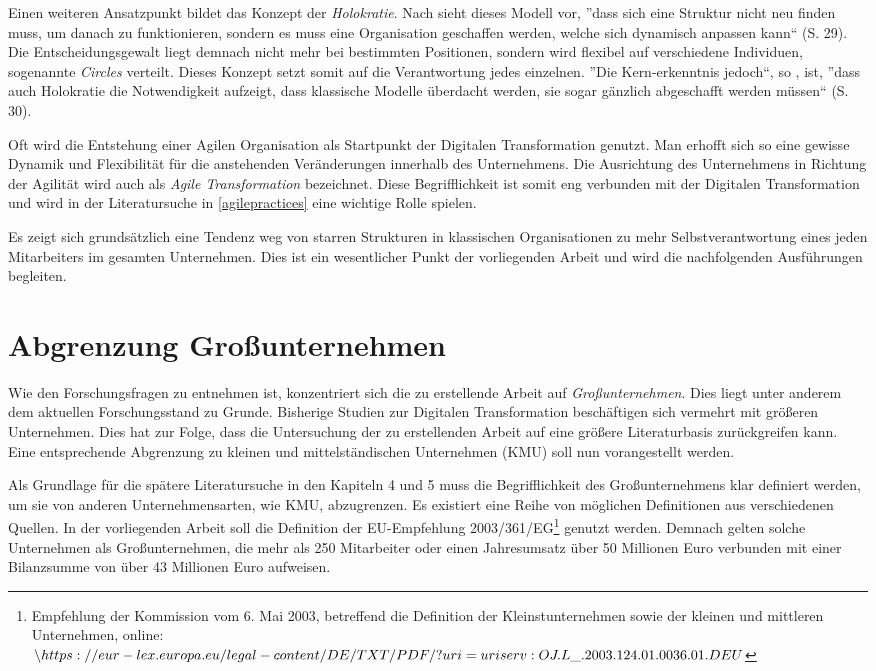 Einen weiteren Ansatzpunkt bildet das Konzept der \textit{Holokratie}. Nach  sieht dieses Modell vor, ''dass sich eine Struktur nicht neu finden muss, um danach zu funktionieren, sondern es muss eine Organisation geschaffen werden, welche sich dynamisch anpassen kann`` (S. 29). Die Entscheidungsgewalt liegt demnach nicht mehr bei bestimmten Positionen, sondern wird flexibel auf verschiedene Individuen, sogenannte \textit{Circles} verteilt. Dieses  Konzept setzt somit auf die Verantwortung jedes einzelnen. ''Die Kern-erkenntnis jedoch``, so , ist,  ''dass auch Holokratie die Notwendigkeit aufzeigt, dass klassische Modelle überdacht werden, sie sogar gänzlich abgeschafft werden müssen`` (S. 30). 

Oft wird die Entstehung einer Agilen Organisation als Startpunkt der Digitalen Transformation genutzt. Man erhofft  sich so eine gewisse Dynamik und Flexibilität für die anstehenden Veränderungen innerhalb des Unternehmens. \cite[S. 1]{fuchs_becoming_nodate} Die Ausrichtung des Unternehmens in Richtung der Agilität wird auch als \textit{Agile Transformation} bezeichnet. Diese Begrifflichkeit ist somit eng verbunden mit der Digitalen Transformation und wird in der Literatursuche in \ref{agilepractices} eine wichtige Rolle spielen.

Es zeigt sich grundsätzlich eine Tendenz weg von starren Strukturen in klassischen Organisationen zu mehr Selbstverantwortung eines jeden Mitarbeiters im gesamten Unternehmen. Dies ist ein wesentlicher Punkt der vorliegenden Arbeit und wird die nachfolgenden Ausführungen begleiten. 

\section{Abgrenzung Großunternehmen}

Wie den Forschungsfragen zu entnehmen ist, konzentriert sich die zu erstellende Arbeit auf \textit{Großunternehmen}. Dies liegt unter anderem dem aktuellen Forschungsstand zu Grunde. Bisherige Studien zur Digitalen Transformation beschäftigen sich vermehrt mit größeren Unternehmen. Dies hat zur Folge, dass die Untersuchung der zu erstellenden Arbeit auf eine größere Literaturbasis zurückgreifen kann. Eine entsprechende Abgrenzung zu kleinen und mittelständischen Unternehmen (KMU) soll nun vorangestellt werden.

Als Grundlage für die spätere Literatursuche in den Kapiteln 4 und 5 muss die Begrifflichkeit  des Großunternehmens  klar definiert werden, um sie von anderen Unternehmensarten, wie KMU, abzugrenzen. Es existiert eine Reihe von möglichen Definitionen aus verschiedenen Quellen. In der vorliegenden Arbeit soll die Definition der EU-Empfehlung 2003/361/EG\footnote{Empfehlung der Kommission vom 6. Mai 2003, betreffend die Definition der Kleinstunternehmen sowie der kleinen und mittleren Unternehmen, online: $\url{https://eur-lex.europa.eu/legal-content/DE/TXT/PDF/?uri=uriserv:OJ.L_.2003.124.01.0036.01.DEU}$} genutzt werden. Demnach gelten solche Unternehmen als Großunternehmen, die mehr als 250 Mitarbeiter oder einen Jahresumsatz über 50 Millionen Euro verbunden mit einer Bilanzsumme von über 43 Millionen Euro aufweisen.

